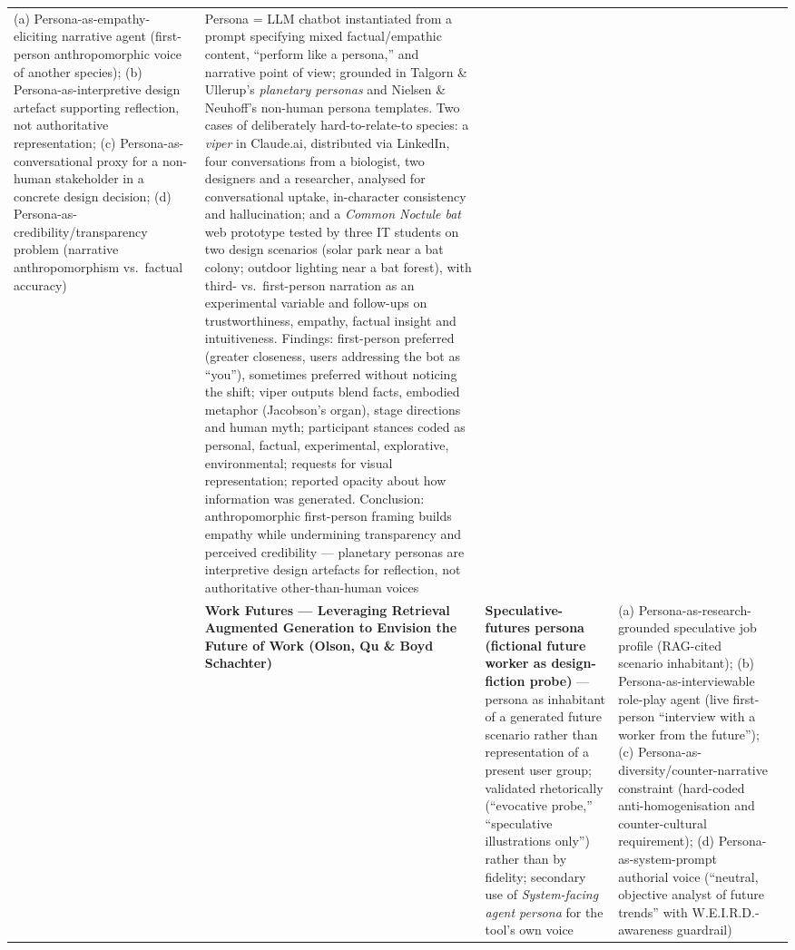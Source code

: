 \begin{table}[t]
\begin{tabular}{p{0.5cm} p{3.6cm} p{3.4cm} p{3.6cm} p{3.6cm}}
(a) Persona-as-empathy-eliciting narrative agent (first-person anthropomorphic voice of another species); (b) Persona-as-interpretive design artefact supporting reflection, not authoritative representation; (c) Persona-as-conversational proxy for a non-human stakeholder in a concrete design decision; (d) Persona-as-credibility/transparency problem (narrative anthropomorphism vs.\ factual accuracy) &
Persona = LLM chatbot instantiated from a prompt specifying mixed factual/empathic content, ``perform like a persona,'' and narrative point of view; grounded in Talgorn \& Ullerup's \emph{planetary personas} and Nielsen \& Neuhoff's non-human persona templates. Two cases of deliberately hard-to-relate-to species: a \emph{viper} in Claude.ai, distributed via LinkedIn, four conversations from a biologist, two designers and a researcher, analysed for conversational uptake, in-character consistency and hallucination; and a \emph{Common Noctule bat} web prototype tested by three IT students on two design scenarios (solar park near a bat colony; outdoor lighting near a bat forest), with third- vs.\ first-person narration as an experimental variable and follow-ups on trustworthiness, empathy, factual insight and intuitiveness. Findings: first-person preferred (greater closeness, users addressing the bot as ``you''), sometimes preferred without noticing the shift; viper outputs blend facts, embodied metaphor (Jacobson's organ), stage directions and human myth; participant stances coded as personal, factual, experimental, explorative, environmental; requests for visual representation; reported opacity about how information was generated. Conclusion: anthropomorphic first-person framing builds empathy while undermining transparency and perceived credibility --- planetary personas are interpretive design artefacts for reflection, not authoritative other-than-human voices \\
\addlinespace
16 & \textbf{Work Futures --- Leveraging Retrieval Augmented Generation to Envision the Future of Work (Olson, Qu \& Boyd Schachter)} &
\textbf{Speculative-futures persona (fictional future worker as design-fiction probe)} --- persona as inhabitant of a generated future scenario rather than representation of a present user group; validated rhetorically (``evocative probe,'' ``speculative illustrations only'') rather than by fidelity; secondary use of \emph{System-facing agent persona} for the tool's own voice &
(a) Persona-as-research-grounded speculative job profile (RAG-cited scenario inhabitant); (b) Persona-as-interviewable role-play agent (live first-person ``interview with a worker from the future''); (c) Persona-as-diversity/counter-narrative constraint (hard-coded anti-homogenisation and counter-cultural requirement); (d) Persona-as-system-prompt authorial voice (``neutral, objective analyst of future trends'' with W.E.I.R.D.-awareness guardrail) &

\end{tabular}
\end{table}
